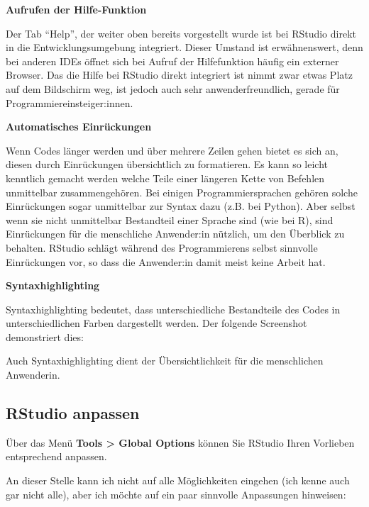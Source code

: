 \documentclass[
]{book}
\begin{document}
\textbf{Aufrufen der Hilfe-Funktion}

Der Tab ``Help'', der weiter oben bereits vorgestellt wurde ist bei RStudio direkt in die Entwicklungsumgebung integriert.
Dieser Umstand ist erwähnenswert, denn bei anderen IDEs öffnet sich bei Aufruf der Hilfefunktion häufig ein externer Browser.
Das die Hilfe bei RStudio direkt integriert ist nimmt zwar etwas Platz auf dem Bildschirm weg, ist jedoch auch sehr anwenderfreundlich, gerade für Programmiereinsteiger:innen.

\textbf{Automatisches Einrückungen}

Wenn Codes länger werden und über mehrere Zeilen gehen bietet es sich an, diesen durch Einrückungen übersichtlich zu formatieren. Es kann so leicht kenntlich gemacht werden welche Teile einer längeren Kette von Befehlen unmittelbar zusammengehören.
Bei einigen Programmiersprachen gehören solche Einrückungen sogar unmittelbar zur Syntax dazu (z.B. bei Python). Aber selbst wenn sie nicht unmittelbar Bestandteil einer Sprache sind (wie bei R), sind Einrückungen für die menschliche Anwender:in nützlich, um den Überblick zu behalten.
RStudio schlägt während des Programmierens selbst sinnvolle Einrückungen vor, so dass die Anwender:in damit meist keine Arbeit hat.

\textbf{Syntaxhighlighting}

Syntaxhighlighting bedeutet, dass unterschiedliche Bestandteile des Codes in unterschiedlichen Farben dargestellt werden. Der folgende Screenshot demonstriert dies:

Auch Syntaxhighlighting dient der Übersichtlichkeit für die menschlichen Anwenderin.

\hypertarget{rstudio-anpassen}{%
\subsection{RStudio anpassen}\label{rstudio-anpassen}}

Über das Menü \textbf{Tools \textgreater{} Global Options} können Sie RStudio Ihren Vorlieben entsprechend anpassen.

An dieser Stelle kann ich nicht auf alle Möglichkeiten eingehen (ich kenne auch gar nicht alle), aber ich möchte auf ein paar sinnvolle Anpassungen hinweisen:
\end{document}
